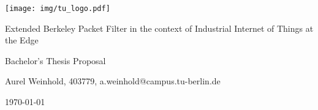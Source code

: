 \documentclass[11pt, a4paper]{scrartcl}
\begin{document}
\begin{title}

    \begin{center}
        \texttt{[image: img/tu\_logo.pdf]}

        \vspace*{2em}
        \LARGE
        Extended Berkeley Packet Filter in the context of Industrial Internet of
        Things at the Edge

        \vspace*{1em}
        \small
        Bachelor's Thesis Proposal

        \vspace*{1em}
        Aurel Weinhold, 403779, a.weinhold@campus.tu-berlin.de

        \vspace*{1em}
        \today

    \end{center}

\end{title}
\end{document}
